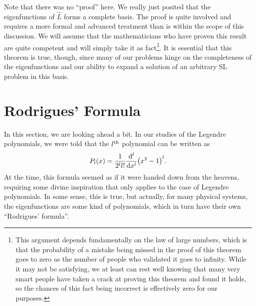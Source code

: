 Note that there was no ``proof'' here.
We really just posited that the eigenfunctions of $\hat{L}$ forms a complete basis.
The proof is quite involved and requires a more formal and advanced treatment than is within the scope of this discussion.
We will assume that the mathematicians who have proven this result are quite competent and will simply take it as fact\footnote{This argument depends fundamentally on the law of large numbers, which is that the probability of a mistake being missed in the proof of this theorem goes to zero as the number of people who validated it goes to infinity. While it may not be satisfying, we at least can rest well knowing that many very smart people have taken a crack at proving this theorem and found it holds, so the chances of this fact being incorrect is effectively zero for our purposes.}.
It is essential that this theorem is true, though, since many of our problems hinge on the completeness of the eigenfunctions and our ability to expand a solution of an arbitrary SL problem in this basis.


\section{Rodrigues' Formula}

In this section, we are looking ahead a bit.
In our studies of the Legendre polynomials, we were told that the $l^{\rm th}$ polynomial can be written as
\begin{eqnarray}
    P_{l}(x) = \frac{1}{2^{l} l!} \dv[l]{x} (x^2 - 1)^{l}
.\end{eqnarray}
At the time, this formula seemed as if it were handed down from the heavens, requiring some divine inspiration that only applies to the case of Legendre polynomials.
In some sense, this is true, but actually, for many physical systems, the eigenfunctions are some kind of polynomials, which in turn have their own ``Rodrigues' formula''.

